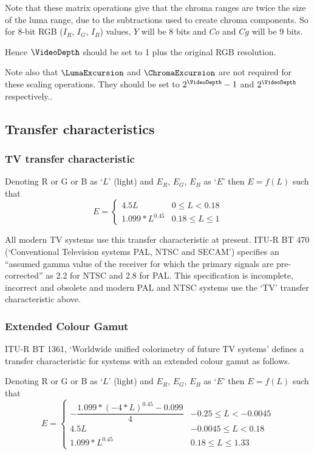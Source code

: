 \begin{informative*}
Note that these matrix operations give that the chroma ranges are twice the
size of the luma range, due to the subtractions used to create chroma components. 
So for 8-bit RGB ($I_R$, $I_G$, $I_B$) values, $Y$ will be 8 bits and $Co$ and
$Cg$ will be 9 bits. 

Hence $\VideoDepth$ should be set to 1 plus the original RGB resolution.

Note also that $\LumaExcursion$ and $\ChromaExcursion$ are not required for
these scaling operations. They should be set to $2^\VideoDepth-1$ and $2^\VideoDepth$
respectively..

\subsection{Transfer characteristics}
\subsubsection{TV transfer characteristic}

Denoting R or G or B as `$L$' (light) and $E_R$, $E_G$, $E_B$ as
`$E$' then $E=f(L)$ such that
\[
E=\left\{
        \begin{array}{ll}
        4.5L & 0\leq L<0.18\\
        1.099*L^{0.45} &0.18\leq L \leq 1
        \end{array}
  \right.
\]

All modern TV systems use this transfer characteristic at present. ITU-R
BT 470 (`Conventional Television systems PAL, NTSC and SECAM') specifies
an ``assumed gamma value of the receiver for which the primary
signals are pre-corrected'' as 2.2 for NTSC and 2.8 for PAL. This
specification is incomplete, incorrect and obsolete and modern PAL and
NTSC systems use the `TV' transfer characteristic above.

\subsubsection{Extended Colour Gamut}

ITU-R BT 1361, `Worldwide unified colorimetry of future TV systems'
defines a transfer characteristic for systems with an extended colour
gamut as follows.

Denoting R or G or B as `$L$' (light) and $E_R$, $E_G$, $E_B$ as
`$E$' then $E=f(L)$ such that
\[
E=\left\{
        \begin{array}{ll}
        -\dfrac{1.099*(-4*L)^{0.45}-0.099}{4} & -0.25\leq L<-0.0045\\
        4.5L & -0.0045\leq L<0.18\\
        1.099*L^{0.45} &0.18\leq L \leq 1.33
        

\end{array}\]
\end{informative*}
